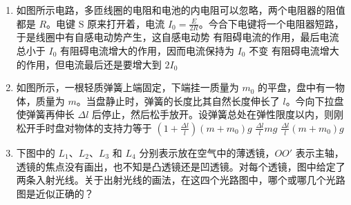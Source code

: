 \documentclass[\gkver]{gaokaozhenti}
\begin{document}
\begin{enumerate}
\item
如图所示电路，多匝线圈的电阻和电池的内电阻可以忽略，两个电阻器的阻值都是 $R$。电键 S 原来打开着，电流 $I_{0}=\frac{E}{2R}$。今合下电键将一个电阻器短路，于是线圈中有自感电动势产生，这自感电动势
{有阻碍电流的作用，最后电流总小于 $I_{0}$}
{有阻碍电流增大的作用，因而电流保持为 $I_{0}$ 不变}
{有阻碍电流增大的作用，但电流最后还是要增大到 $2I_{0}$}


\item
如图所示，一根轻质弹簧上端固定，下端挂一质量为 $m_{0}$ 的平盘，盘中有一物体，质量为 $m$。当盘静止时，弹簧的长度比其自然长度伸长了 $l$。今向下拉盘使弹簧再伸长 $\Delta l$ 后停止，然后松手放开。设弹簧总处在弹性限度以内，则刚松开手时盘对物体的支持力等于
{$\left(1+\frac{\Delta l}{l}\right)(m+m_{0})g$}
{$\frac{\Delta l}{l}mg$}
{$\frac{\Delta l}{l}(m+m_{0})g$}


\item
下图中的 $L_{1}$、$L_{2}$、$L_{3}$ 和 $L_{4}$ 分别表示放在空气中的薄透镜，$OO'$ 表示主轴，透镜的焦点没有画出，也不知是凸透镜还是凹透镜。对每个透镜，图中给定了两条入射光线。关于出射光线的画法，在这四个光路图中，哪个或哪几个光路图是近似正确的？
\fourchoices[answer=BD, ispicture=true, h=2.3cm]
{}
{}
{}
{}


\end{enumerate}
\end{document}
